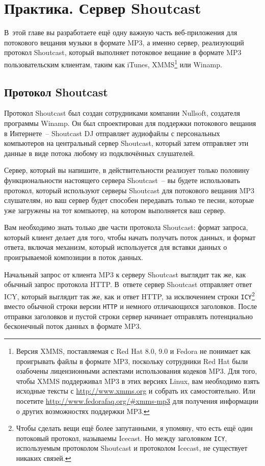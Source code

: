 \chapter{Практика. Сервер Shoutcast}
\label{ch:28}

\thispagestyle{empty}

В~этой главе вы разработаете ещё одну важную часть веб-приложения для потокового вещания
музыки в формате MP3, а именно сервер, реализующий протокол Shoutcast, который
выполняет потоковое вещание в формате MP3 пользовательским клиентам, таким как iTunes,
XMMS\footnote{Версия XMMS, поставляемая с Red Hat 8.0, 9.0 и Fedora не понимает как
  проигрывать файлы в формате MP3, поскольку сотрудники Red Hat были озабочены
  лицензионными аспектами использования кодеков MP3.  Для того, чтобы XMMS поддерживал MP3
  в этих версиях Linux, вам необходимо взять исходные тексты с \url{http://www.xmms.org} и
  собрать их самостоятельно.  Или посетите \url{http://www.fedorafaq.org/#xmms-mp3} для
  получения информации о других возможностях поддержки MP3.} или Winamp.

\section{Протокол Shoutcast}

Протокол Shoutcast был создан сотрудниками компании Nullsoft, создателя программы
Winamp. Он был спроектирован для поддержки потокового вещания в Интернете~-- Shoutcast DJ
отправляет аудиофайлы с персональных компьютеров на центральный сервер Shoutcast, который
затем отправляет эти данные в виде потока любому из подключённых слушателей.

Сервер, который вы напишите, в действительности реализует только половину функциональности
настоящего сервера Shoutcast~-- вы будете использовать протокол, который используют
серверы Shoutcast для потокового вещания MP3 слушателям, но ваш сервер будет способен
передавать только те песни, которые уже загружены на тот компьютер, на котором выполняется
ваш сервер.

Вам необходимо знать только две части протокола Shoutcast: формат запроса, который клиент
делает для того, чтобы начать получать поток данных, и формат ответа, включая механизм,
который используется для вставки данных о проигрываемой композиции в поток данных.

Начальный запрос от клиента MP3 к серверу Shoutcast выглядит так же, как обычный запрос
протокола HTTP.  В~ответе сервер Shoutcast отправляет ответ ICY, который выглядит так же,
как и ответ HTTP, за исключением строки \lstinline{ICY}\footnote{Чтобы сделать вещи ещё более
  запутанными, я упомяну, что есть ещё один потоковый протокол, называемы Icecast. Но
  между заголовком \lstinline{ICY}, используемым протоколом Shoutcast и протоколом Icecast, не
  существует никаких связей.} вместо обычной строки версии \lstinline{HTTP} и немного
отличающихся заголовков. После отправки заголовков и пустой строки сервер начинает
отправлять потенциально бесконечный поток данных в формате MP3.

